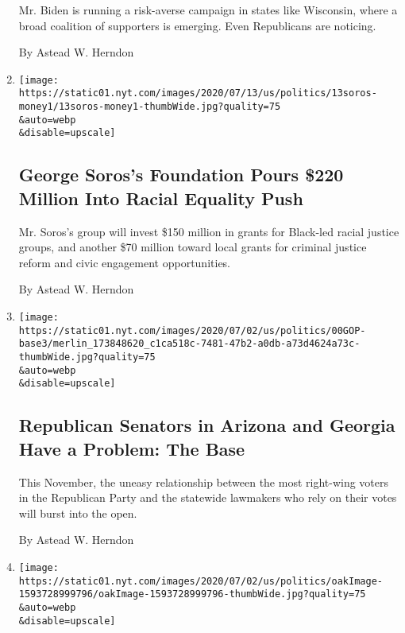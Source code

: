 \begin{enumerate}
  Mr. Biden is running a risk-averse campaign in states like Wisconsin,
  where a broad coalition of supporters is emerging. Even Republicans
  are noticing.

  By Astead W. Herndon
\item
  \href{/2020/07/13/us/politics/george-soros-racial-justice-organizations.html}{}

  \texttt{[image: https://static01.nyt.com/images/2020/07/13/us/politics/13soros-money1/13soros-money1-thumbWide.jpg?quality=75\\\&auto=webp\\\&disable=upscale]}

  \hypertarget{george-soross-foundation-pours-220-million-into-racial-equality-push}{%
  \subsection{George Soros's Foundation Pours \$220 Million Into Racial
  Equality
  Push}\label{george-soross-foundation-pours-220-million-into-racial-equality-push}}

  Mr. Soros's group will invest \$150 million in grants for Black-led
  racial justice groups, and another \$70 million toward local grants
  for criminal justice reform and civic engagement opportunities.

  By Astead W. Herndon
\item
  \href{/2020/07/09/us/politics/kelly-loeffler-georgia-senate-arizona.html}{}

  \texttt{[image: https://static01.nyt.com/images/2020/07/02/us/politics/00GOP-base3/merlin\_173848620\_c1ca518c-7481-47b2-a0db-a73d4624a73c-thumbWide.jpg?quality=75\\\&auto=webp\\\&disable=upscale]}

  \hypertarget{republican-senators-in-arizona-and-georgia-have-a-problem-the-base}{%
  \subsection{Republican Senators in Arizona and Georgia Have a Problem:
  The
  Base}\label{republican-senators-in-arizona-and-georgia-have-a-problem-the-base}}

  This November, the uneasy relationship between the most right-wing
  voters in the Republican Party and the statewide lawmakers who rely on
  their votes will burst into the open.

  By Astead W. Herndon
\item
  \href{/2020/07/02/us/politics/waukesha-wisconsin-biden-trump.html}{}

  \texttt{[image: https://static01.nyt.com/images/2020/07/02/us/politics/oakImage-1593728999796/oakImage-1593728999796-thumbWide.jpg?quality=75\\\&auto=webp\\\&disable=upscale]}


\end{enumerate}
